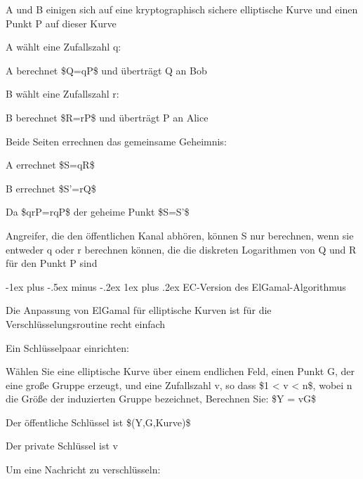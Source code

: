 \documentclass[a4paper]{article}
\makeatletter
\renewcommand{\subsubsection}{\@startsection{subsubsection}{3}{0mm}%
 {-1ex plus -.5ex minus -.2ex}%
 {1ex plus .2ex}%
 {\normalfont\small\bfseries}}
\makeatother
\begin{document}
\begin{multicols}{3}
\begin{itemize*}
            \begin{itemize*}
                  \item A und B einigen sich auf eine kryptographisch sichere elliptische Kurve und einen Punkt P auf dieser Kurve
                  \item A wählt eine Zufallszahl q:
                  \begin{itemize*} \item A berechnet \$Q=qP\$ und überträgt Q an Bob \end{itemize*}
                  \item B wählt eine Zufallszahl r:
                  \begin{itemize*} \item B berechnet \$R=rP\$ und überträgt P an Alice \end{itemize*}
                  \item Beide Seiten errechnen das gemeinsame Geheimnis:
                  \begin{itemize*} \item A errechnet \$S=qR\$ \item B errechnet \$S'=rQ\$ \item Da \$qrP=rqP\$ der geheime Punkt \$S=S'\$ \end{itemize*}
            \end{itemize*}
            \item
            Angreifer, die den öffentlichen Kanal abhören, können S nur berechnen,
            wenn sie entweder q oder r berechnen können, die die diskreten
            Logarithmen von Q und R für den Punkt P sind
      \end{itemize*}


      \subsubsection{EC-Version des
            ElGamal-Algorithmus}

      \begin{itemize*}
            \item
            Die Anpassung von ElGamal für elliptische Kurven ist für die
            Verschlüsselungsroutine recht einfach
            \item
            Ein Schlüsselpaar einrichten:

            \begin{itemize*}
                  \item Wählen Sie eine elliptische Kurve über einem endlichen Feld, einen Punkt G, der eine große Gruppe erzeugt, und eine Zufallszahl v, so dass \$1 \textless{} v \textless{} n\$, wobei n die Größe der induzierten Gruppe bezeichnet, Berechnen Sie: \$Y = vG\$
                  \item Der öffentliche Schlüssel ist \$(Y,G,Kurve)\$
                  \item Der private Schlüssel ist v
            \end{itemize*}
            \item
            Um eine Nachricht zu verschlüsseln:


\end{itemize*}
\end{multicols}
\end{document}
